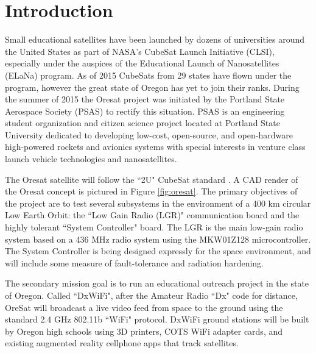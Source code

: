 \documentclass[]{aiaa-tc}%
\begin{document}
\section{Introduction}
Small educational satellites have been launched by dozens of universities around the United States as part of NASA’s CubeSat Launch Initiative (CLSI), especially under the auspices of the Educational Launch of Nanosatellites (ELaNa) program. As of 2015 CubeSats from 29 states have flown under the program, however the great state of Oregon has yet to join their ranks\cite{Mahoney:15bk}. During the summer of 2015 the Oresat project was initiated by the Portland State Aerospace Society (PSAS) to rectify this situation. PSAS is an engineering student organization and citizen science project located at Portland State University dedicated to developing low-cost, open-source, and open-hardware high-powered rockets and avionics systems with special interests in venture class launch vehicle technologies and nanosatellites\cite{PSAS:15bk}.

The Oresat satellite will follow the ``2U" CubeSat standard \cite{Cubesat:14bk}. A CAD render of the Oresat concept is pictured in Figure \ref{fig:oresat}. The primary objectives of the project are to test several subsystems in the environment of a 400 km circular Low Earth Orbit: the ``Low Gain Radio (LGR)" communication board and the highly tolerant ``System Controller" board. The LGR is the main low-gain radio system based on a 436 MHz radio system using the MKW01Z128 microcontroller. The System Controller is being designed expressly for the space environment, and will include some measure of fault-tolerance and radiation hardening.

The secondary mission goal is to run an educational outreach project in the state of Oregon. Called ``DxWiFi", after the Amateur Radio ``Dx" code for distance, OreSat will broadcast a live video feed from space to the ground using the standard 2.4 GHz  802.11b ``WiFi" protocol. DxWiFi ground stations will be built by Oregon high schools using 3D printers, COTS WiFi adapter cards, and existing augmented reality cellphone apps that track satellites.
\end{document}
